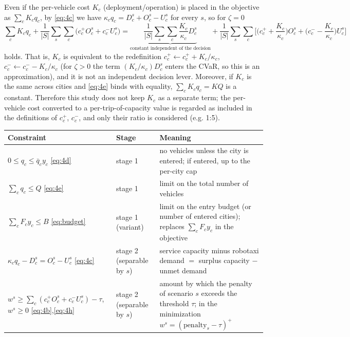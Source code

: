\documentclass[10pt,a4paper]{article}
\begin{document}
Even if the per-vehicle cost $K_c$ (deployment/operation) is placed in the objective as $\sum_c K_c q_c$, by \eqref{eq:4c} we have $\kappa_c q_c=D_c^s+O_c^s-U_c^s$ for every $s$, so for $\zeta=0$
\begin{equation}\label{eq:absorb}
\sum_{c}K_c q_c+\frac1{|S|}\sum_{s}\sum_{c}\big(c_c^+O_c^s+c_c^-U_c^s\big)
=\underbrace{\frac1{|S|}\sum_s\sum_c\frac{K_c}{\kappa_c}D_c^s}_{\text{constant independent of the decision}}
+\frac1{|S|}\sum_{s}\sum_{c}\Big[\Big(c_c^++\frac{K_c}{\kappa_c}\Big)O_c^s+\Big(c_c^--\frac{K_c}{\kappa_c}\Big)U_c^s\Big]
\end{equation}
holds. That is, $K_c$ is equivalent to the redefinition $c_c^+\leftarrow c_c^++K_c/\kappa_c$, $c_c^-\leftarrow c_c^--K_c/\kappa_c$ (for $\zeta>0$ the term $(K_c/\kappa_c)D_c^s$ enters the CVaR, so this is an approximation), and it is not an independent decision lever. Moreover, if $K_c$ is the same across cities and \eqref{eq:4e} binds with equality, $\sum_c K_c q_c=KQ$ is a constant. Therefore this study does not keep $K_c$ as a separate term; the per-vehicle cost converted to a per-trip-of-capacity value is regarded as included in the definitions of $c_c^+$, $c_c^-$, and only their ratio is considered (e.g. 1:5).

{\footnotesize
\begin{longtable}{@{}L{0.34\textwidth}L{0.12\textwidth}L{0.50\textwidth}@{}}
\toprule Constraint & Stage & Meaning\\\midrule\endhead\bottomrule\endlastfoot
$0\le q_c\le\bar q_c y_c$ \eqref{eq:4d} & stage 1 & no vehicles unless the city is entered; if entered, up to the per-city cap\\
$\sum_c q_c\le Q$ \eqref{eq:4e} & stage 1 & limit on the total number of vehicles\\
$\sum_c F_c y_c\le B$ \eqref{eq:budget} & stage 1 (variant) & limit on the entry budget (or number of entered cities); replaces $\sum_c F_c y_c$ in the objective\\
$\kappa_c q_c-D_c^s=O_c^s-U_c^s$ \eqref{eq:4c} & stage 2 (separable by $s$) & service capacity minus robotaxi demand $=$ surplus capacity $-$ unmet demand\\
$w^s\ge\sum_c(c_c^+O_c^s+c_c^-U_c^s)-\tau$, $w^s\ge0$ \eqref{eq:4b},\eqref{eq:4h} & stage 2 (separable by $s$) & amount by which the penalty of scenario $s$ exceeds the threshold $\tau$; in the minimization $w^s=(\text{penalty}_s-\tau)^+$\\
\end{longtable}}
\end{document}
